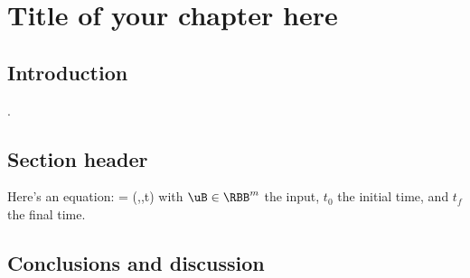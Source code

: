 \chapter[Title of your chapter here]{Title of your chapter here}
\label{chap: chapter 1}


\chapterabstract{\lipsum[1]}

\section{Introduction}
\label{sec: chap2 intro}

\lipsum[5-7] \cite{Astrid2008}.


\section{Section header}
\label{sec: chap2 section header}

Here's an equation:
\be
\label{eq: chap2 vector field} \dot{\xBF} = \fB(\xBF,\uB,t)
\ee
with $\uB\in\RBB^m$ the input, $t_0$ the initial time, and $t_f$ the final time. 


\section{Conclusions and discussion}
\label{sec: chap2 conclusion}

\lipsum[10-13]


